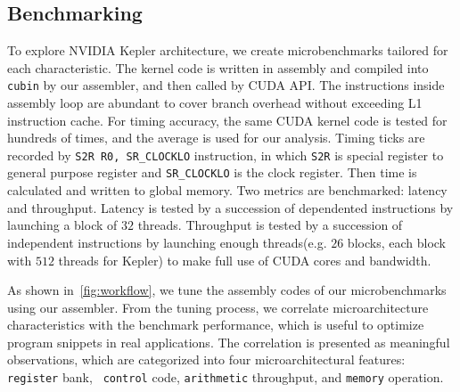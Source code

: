 \subsection{Benchmarking} %
\label{sec:benchmark}


To explore NVIDIA Kepler architecture, we create microbenchmarks tailored for each characteristic.
The kernel code is written in assembly and compiled into {\tt cubin} by our assembler, and then called by CUDA API.
The instructions inside assembly loop are abundant to cover branch overhead without exceeding L1 instruction cache.
For timing accuracy, the same CUDA kernel code is tested for hundreds of times, and the average is used for our analysis.
Timing ticks are recorded by {\tt S2R R0, SR\_CLOCKLO} instruction, in which {\tt S2R} is special register to general
purpose register and  {\tt SR\_CLOCKLO} is the clock register. Then time is calculated and written to global memory.
Two metrics are benchmarked: latency and throughput. Latency is tested by a succession of dependented instructions by
launching a block of $32$ threads. Throughput is tested by a succession of independent instructions by launching enough
threads(e.g. $26$ blocks, each block with $512$ threads for Kepler) to make full use of CUDA cores and bandwidth.

As shown in~\ref{fig:workflow}, we tune the assembly codes of our microbenchmarks using our assembler.
From the tuning process, we correlate microarchitecture characteristics with the benchmark performance, which is useful
to optimize program snippets in real applications.
The correlation is presented as meaningful observations, which are categorized into four microarchitectural features:  {\tt register} bank, {\tt
control} code,  {\tt arithmetic} throughput, and {\tt memory} operation.


